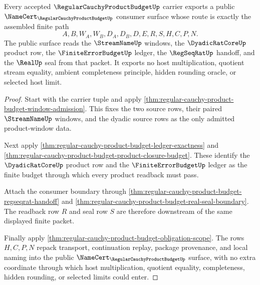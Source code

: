 \begin{theorem}
\label{thm:regular-cauchy-product-budget-public-export}
Every accepted $\RegularCauchyProductBudgetUp$ carrier exports a public $\NameCert_{\RegularCauchyProductBudgetUp}$ consumer surface whose route is exactly the assembled finite path
$$
A,B,W_A,W_B,D_A,D_B,D,E,R,S,H,C,P,N.
$$
The public surface reads the $\StreamNameUp$ windows, the $\DyadicRatCoreUp$ product row, the $\FiniteErrorBudgetUp$ ledger, the $\RegSeqRatUp$ handoff, and the $\RealUp$ seal from that packet. It exports no host multiplication, quotient stream equality, ambient completeness principle, hidden rounding oracle, or selected host limit.
\end{theorem}
\begin{proof}
Start with the carrier tuple and apply \autoref{thm:regular-cauchy-product-budget-window-admission}. This fixes the two source rows, their paired $\StreamNameUp$ windows, and the dyadic source rows as the only admitted product-window data.

Next apply \autoref{thm:regular-cauchy-product-budget-ledger-exactness} and \autoref{thm:regular-cauchy-product-budget-product-closure-budget}. These identify the $\DyadicRatCoreUp$ product row and the $\FiniteErrorBudgetUp$ ledger as the finite budget through which every product readback must pass.

Attach the consumer boundary through \autoref{thm:regular-cauchy-product-budget-regseqrat-handoff} and \autoref{thm:regular-cauchy-product-budget-real-seal-boundary}. The readback row $R$ and seal row $S$ are therefore downstream of the same displayed finite packet.

Finally apply \autoref{thm:regular-cauchy-product-budget-obligation-scope}. The rows $H,C,P,N$ repack transport, continuation replay, package provenance, and local naming into the public $\NameCert_{\RegularCauchyProductBudgetUp}$ surface, with no extra coordinate through which host multiplication, quotient equality, completeness, hidden rounding, or selected limits could enter.
\end{proof}


